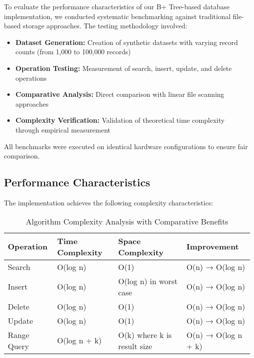 \documentclass[12pt,a4paper]{article}  %
\begin{document}
To evaluate the performance characteristics of our B+ Tree-based database implementation, we conducted systematic benchmarking against traditional file-based storage approaches. The testing methodology involved:

\begin{itemize}
    \item \textbf{Dataset Generation:} Creation of synthetic datasets with varying record counts (from 1,000 to 100,000 records)
    \item \textbf{Operation Testing:} Measurement of search, insert, update, and delete operations
    \item \textbf{Comparative Analysis:} Direct comparison with linear file scanning approaches
    \item \textbf{Complexity Verification:} Validation of theoretical time complexity through empirical measurement
\end{itemize}

All benchmarks were executed on identical hardware configurations to ensure fair comparison.

\subsection{Performance Characteristics}

The implementation achieves the following complexity characteristics:

\begin{table}[H]
\centering
{}
\setlength{\arrayrulewidth}{1pt}  %
\renewcommand{\arraystretch}{1.3}  %
\begin{tabular}{|p{3cm}|p{4cm}|p{4cm}|p{3cm}|}
\hline
\rowcolor{uetblue!15} 
\textbf{Operation} & \textbf{Time Complexity} & \textbf{Space Complexity} & \textbf{Improvement} \\
\hline
Search & O(log n) & O(1) & O(n) → O(log n) \\
\hline
Insert & O(log n) & O(log n) in worst case & O(n) → O(log n) \\
\hline
Delete & O(log n) & O(1) & O(n) → O(log n) \\
\hline
Update & O(log n) & O(1) & O(n) → O(log n) \\
\hline
Range Query & O(log n + k) & O(k) where k is result size & O(n) → O(log n + k) \\
\hline
\end{tabular}
\caption{Algorithm Complexity Analysis with Comparative Benefits}
\label{tab:complexity_comparative}
\end{table}
\end{document}
